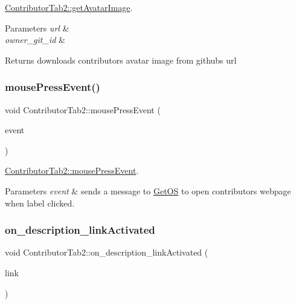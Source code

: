 \hyperlink{classContributorTab2_aed6aceb6bd6c0fb3d32e435a731133d8}{Contributor\+Tab2\+::get\+Avatar\+Image}. 


\begin{DoxyParams}{Parameters}
{\em url} & \\
\hline
{\em owner\+\_\+git\+\_\+id} & \\
\hline
\end{DoxyParams}
\begin{DoxyReturn}{Returns}
downloads contributor\textquotesingle{}s avatar image from github\textquotesingle{}s url 
\end{DoxyReturn}
\mbox{\label{classContributorTab2_a93c3ed51e9f40c439ed4182e4407434a}} 
\subsubsection{\texorpdfstring{mouse\+Press\+Event()}{mousePressEvent()}}
{\footnotesize\ttfamily void Contributor\+Tab2\+::mouse\+Press\+Event (\begin{DoxyParamCaption}\item[{Q\+Mouse\+Event $\ast$}]{event }\end{DoxyParamCaption})\hspace{0.3cm}{\ttfamily [protected]}}



\hyperlink{classContributorTab2_a93c3ed51e9f40c439ed4182e4407434a}{Contributor\+Tab2\+::mouse\+Press\+Event}. 


\begin{DoxyParams}{Parameters}
{\em event} & sends a message to \hyperlink{classGetOS}{Get\+OS} to open contributors webpage when label clicked. \\
\hline
\end{DoxyParams}
\mbox{\label{classContributorTab2_a22fb06bbd151a407ff40404897cabb4d}} 
\subsubsection{\texorpdfstring{on\+\_\+description\+\_\+link\+Activated}{on\_description\_linkActivated}}
{\footnotesize\ttfamily void Contributor\+Tab2\+::on\+\_\+description\+\_\+link\+Activated (\begin{DoxyParamCaption}\item[{const Q\+String \&}]{link }\end{DoxyParamCaption})\hspace{0.3cm}{\ttfamily [slot]}}



